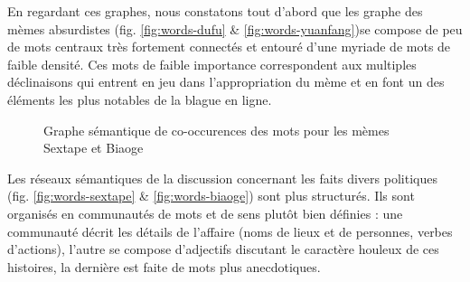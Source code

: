 En regardant ces graphes, nous constatons tout d{\textquoteright}abord que les graphe des mèmes absurdistes (fig. \ref{fig:words-dufu} \& \ref{fig:words-yuanfang})se compose de peu de mots centraux très fortement connectés et entouré d{\textquoteright}une myriade de mots de faible densité. Ces mots de faible importance correspondent aux multiples déclinaisons qui entrent en jeu dans l'appropriation du mème et en font un des éléments les plus notables de la blague en ligne.

\begin{figure}[h!]
    \centering
    
  \caption{
    Graphe sémantique de co-occurences des mots pour les mèmes Sextape et Biaoge
  }
\end{figure}


Les réseaux sémantiques de la discussion concernant les faits divers politiques (fig. \ref{fig:words-sextape} \& \ref{fig:words-biaoge}) sont plus structurés. Ils sont organisés en communautés de mots et de sens plut\^ot bien définies : une communauté décrit les détails de l{\textquoteright}affaire (noms de lieux et de personnes, verbes d{\textquoteright}actions), l{\textquoteright}autre se compose d{\textquoteright}adjectifs discutant le caractère houleux de ces histoires, la dernière est faite de mots plus anecdotiques.

